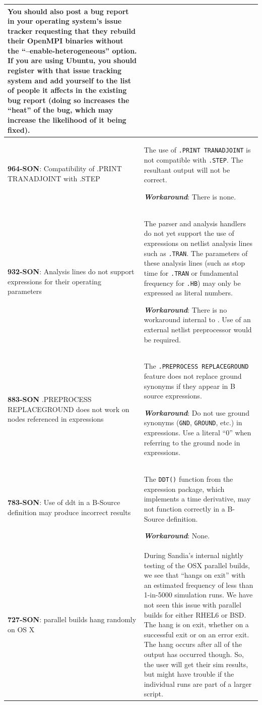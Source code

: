 {\begin{longtable}[h] {>{\raggedright\small}m{2in}|>{\raggedright\let\\\tabularnewline\small}m{3.5in}}
You should also post a bug report in your operating system's issue
tracker requesting that they rebuild their OpenMPI binaries without
the ``--enable-heterogeneous'' option.  If you are using Ubuntu, you
should register with that issue tracking system and add yourself to
the list of people it affects in the existing bug report (doing so
increases the ``heat'' of the bug, which may increase the likelihood
of it being fixed).

\\ \hline

\textbf{964-SON}: Compatibility of .PRINT TRANADJOINT with .STEP & The use of
\texttt{.PRINT TRANADJOINT} is not compatible with \texttt{.STEP}.  The
resultant \Xyce{} output will not be correct.

\textbf{\textit{Workaround}}: There is none.
\\ \hline

\textbf{932-SON}: Analysis lines do not support expressions for their
operating parameters & The \Xyce{} parser and analysis handlers do not
yet support the use of expressions on netlist analysis lines such
as \texttt{.TRAN}.  The parameters of these analysis lines (such as
stop time for \texttt{.TRAN} or fundamental frequency
for \texttt{.HB}) may only be expressed as literal numbers.

\textbf{\textit{Workaround}}: There is no workaround internal to \Xyce{}.
Use of an external netlist preprocessor would be required. \\ \hline

\textbf{883-SON} .PREPROCESS REPLACEGROUND does not work on nodes referenced
in expressions & The \texttt{.PREPROCESS REPLACEGROUND} feature does
not replace ground synonyms if they appear in B source expressions.

\textbf{\textit{Workaround}}: Do not use ground synonyms (\texttt{GND},
\texttt{GROUND}, etc.) in expressions.  Use a literal ``0'' when
referring to the ground node in expressions.\\ \hline

\textbf{783-SON}: Use of ddt in a B-Source definition may produce incorrect
results & The \texttt{DDT()} function from the \Xyce{} expression
package, which implements a time derivative, may not function
correctly in a B-Source definition.

\textbf{\textit{Workaround}}: None. \\ \hline

\textbf{727-SON}: \Xyce{} parallel builds hang randomly on OS X & During
Sandia's internal nightly testing of the OSX parallel builds, we see
that \Xyce{} ``hangs on exit'' with an estimated frequency of less
than 1-in-5000 simulation runs.  We have not seen this issue with
parallel builds for either RHEL6 or BSD.  The hang is on exit, whether
on a successful exit or on an error exit.  The hang occurs after all
of the \Xyce{} output has occurred though.  So, the user will get
their sim results, but might have trouble if the individual \Xyce{}
runs are part of a larger script.


\end{longtable}}
